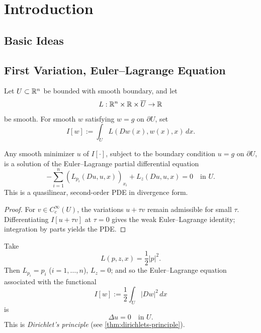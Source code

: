 
\section{Introduction}
\label{sec:calculus-of-variations-introduction}

\subsection{Basic Ideas}
\label{sec:basic-ideas-calculus-of-variations}

\subsection{First Variation, Euler--Lagrange Equation}
\label{sec:first-variation-euler-lagrange}

Let $U\subset\mathbb{R}^n$ be bounded with smooth boundary, and let
\[
L:\mathbb{R}^n\times\mathbb{R}\times\overline U\to\mathbb{R}
\]
be smooth. For smooth $w$ satisfying $w=g$ on $\partial U$, set
\[
I[w]:=\int_U L(Dw(x),w(x),x)\,dx.
\tag{4}
\]

\begin{theorem}
\label{thm:euler-lagrange-equation-pde-minimizer}
Any smooth minimizer $u$ of $I[\cdot]$, subject to the boundary condition $u = g$ on $\partial U$, is a solution of the Euler--Lagrange partial differential equation
\[
-\sum_{i=1}^{n}(L_{p_i}(Du, u, x))_{x_i} + L_z(Du, u, x) = 0 \quad \text{in } U.
\]
This is a quasilinear, second-order PDE in divergence form.
\end{theorem}

\begin{proof}
\sketch For $v\in C_c^\infty(U)$, the variations $u+\tau v$ remain admissible for small $\tau$. Differentiating $I[u+\tau v]$ at $\tau=0$ gives the weak Euler--Lagrange identity; integration by parts yields the PDE.
\end{proof}

\begin{example}
\label{ex:dirichlets-principle-calculus-of-variations}

Take
\[
L(p, z, x) = \frac{1}{2}|p|^2.
\]
Then $L_{p_i} = p_i$ ($i = 1, \ldots, n$), $L_z = 0$; and so the Euler--Lagrange equation associated with the functional
\[
I[w] := \frac{1}{2}\int_U |Dw|^2 \, dx
\]
is
\[
\Delta u = 0 \quad \text{in } U.
\]
This is \textit{Dirichlet's principle} (see \cref{thm:dirichlets-principle}).
\end{example}

